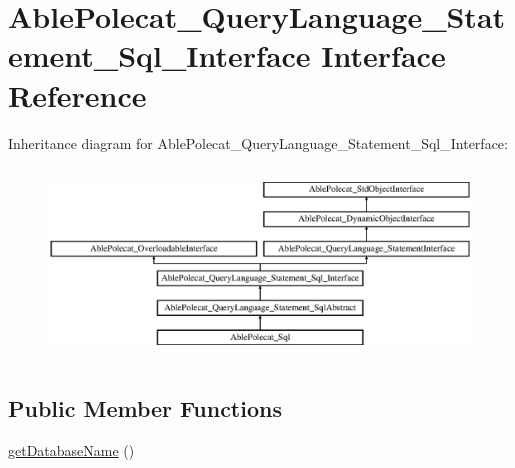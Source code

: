 \hypertarget{interface_able_polecat___query_language___statement___sql___interface}{}\section{Able\+Polecat\+\_\+\+Query\+Language\+\_\+\+Statement\+\_\+\+Sql\+\_\+\+Interface Interface Reference}
\label{interface_able_polecat___query_language___statement___sql___interface}
Inheritance diagram for Able\+Polecat\+\_\+\+Query\+Language\+\_\+\+Statement\+\_\+\+Sql\+\_\+\+Interface\+:\begin{figure}[H]
\begin{center}
\leavevmode
\includegraphics[height=5.106383cm]{interface_able_polecat___query_language___statement___sql___interface}
\end{center}
\end{figure}
\subsection*{Public Member Functions}
\begin{DoxyCompactItemize}
\item 
\hyperlink{interface_able_polecat___query_language___statement___sql___interface_a6c2092833f367c0aefa1eee1065a2e9e}{get\+Database\+Name} ()
\end{DoxyCompactItemize}
